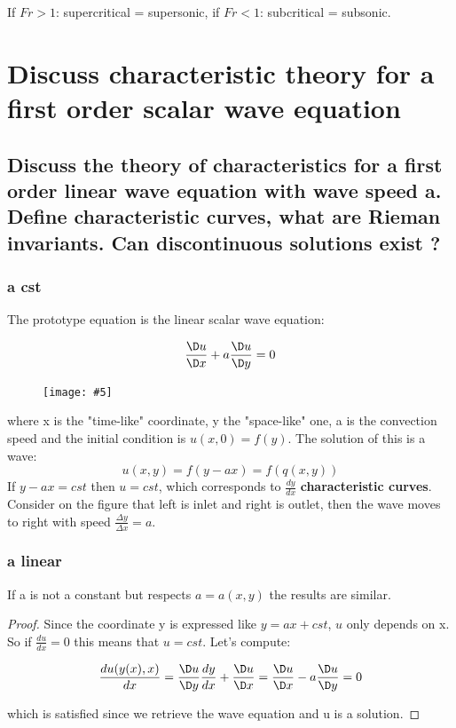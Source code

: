 \documentclass[british,french,11pt, a4paper, openany]{article}
\newcommand{\wrapfig}[6]{%
	\begin{figure}%
		\vspace{-5mm}%
		\texttt{[image: \#5]}%
		\captionof{figure}{}%
		\label{#6}%
	\end{figure}%
}
\begin{document}
If $Fr > 1$: supercritical = supersonic, if $Fr < 1$: subcritical = subsonic. 



\section{Discuss characteristic theory for a first order scalar wave equation}
\subsection{Discuss the theory of characteristics for a first order linear wave equation with wave speed a. Define characteristic curves, what are Rieman invariants. Can discontinuous solutions exist ?}

\subsubsection{a cst}	
The prototype equation is the linear scalar wave equation: 

\begin{equation}
\frac{\D u}{\D x} + a \frac{\D u}{\D y} = 0
\end{equation}

\wrapfig{9}{l}{6}{0.2}{ch8/9}{ch8/9}
where x is the "time-like" coordinate, y the "space-like" one, a is the convection speed and the initial condition is $u(x,0) = f(y)$. The solution of this is a wave: 
\begin{equation}
u(x,y) = f(y-ax) = f(q(x,y))
\end{equation}
If $y-ax = cst$ then $u= cst$, which corresponds to $\frac{dy}{dx}$ \textbf{characteristic curves}. Consider on the figure that left is inlet and right is outlet, then the wave moves to right with speed $\frac{\Delta y}{\Delta x} = a$. 

\subsubsection{a linear}
If a is not a constant but respects $a = a(x,y)$ the results are similar. 

\begin{proof}
	Since the coordinate y is expressed like $y = ax + cst$, $u$ only depends on x. So if $\frac{du}{dx} = 0$ this means that $u = cst$. Let's compute: 
	
	\begin{equation}
	\frac{du(y(x),x)}{dx} = \frac{\D u}{\D y} \frac{d y}{dx} + \frac{\D u}{\D x} = \frac{\D u}{\D x} -a \frac{\D u}{\D y} = 0
	\end{equation}
	
	which is satisfied since we retrieve the wave equation and u is a solution. 
\end{proof}
\end{document}
